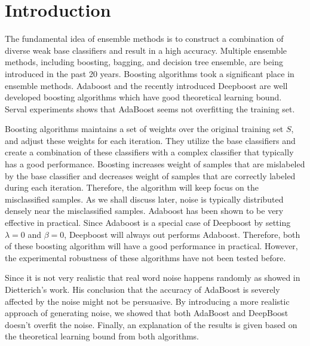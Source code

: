 \section{Introduction}
The fundamental idea of ensemble methods is to construct a combination of diverse weak base classifiers and result in a high accuracy.
Multiple ensemble methods, including boosting\cite{}, bagging\cite{}, and decision tree ensemble\cite{}, are being introduced in the past 20 years.
Boosting algorithms took a significant place in ensemble methods. Adaboost\cite{freund1997decision} and the recently introduced Deepboost\cite{cortes2014deep}
are well developed boosting algorithms which have good theoretical learning bound. Serval experiments shows that AdaBoost seems not overfitting the training set.

Boosting algorithms maintains a set of weights over the original training set $S$, and adjust these weights for each iteration.
They utilize the base classifiers and create a combination of these classifiers with a complex classifier that typically has a good performance.
Boosting increases weight of samples that are mislabeled by the base classifier and decreases weight of samples that are correctly labeled during each iteration.
Therefore, the algorithm will keep focus on the misclassified samples.
As we shall discuss later, noise is typically distributed densely near the misclassified samples.
Adaboost has been shown to be very effective in practical\cite{quinlan1996bagging}.
Since Adaboost is a special case of Deepboost by setting $\lambda=0$ and $\beta=0$, Deepboost will always out performs Adaboost.
Therefore, both of these boosting algorithm will have a good performance in practical.
However, the experimental robustness of these algorithms have not been tested before.

Since it is not very realistic that real word noise happens randomly as showed in Dietterich's work\cite{dietterich2000experimental}. His conclusion that the accuracy of AdaBoost is severely affected by the noise might not be persuasive.
By introducing a more realistic approach of generating noise, we showed that both AdaBoost and DeepBoost doesn't overfit the noise. Finally, an explanation of the results is given based on the theoretical learning bound from both algorithms.
